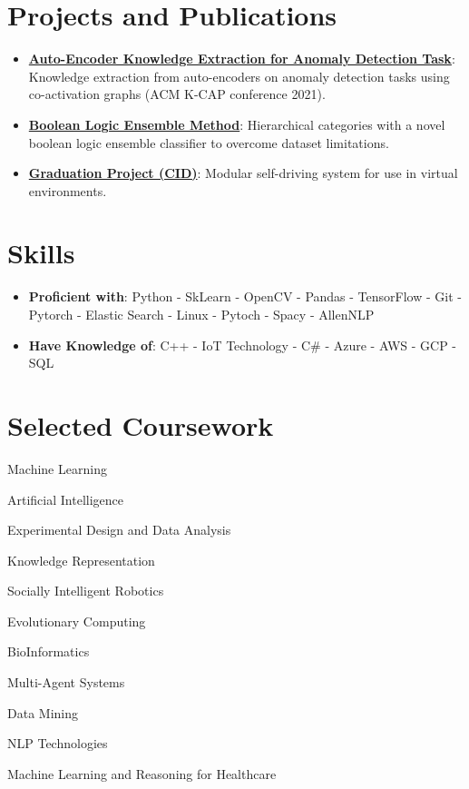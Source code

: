 \documentclass[letterpaper,11pt]{article}
\newcommand{\resumeItem}[2]{
  \item\small{
    \textbf{#1}{: #2 \vspace{-2pt}}
  }
}
\newcommand{\resumeItemNew}[1]{
	\item{
		{#1}
	}

	
}
\newcommand{\resumeNewItem}[1]{\resumeItemNew{#1}\vspace{-7pt}}
\newcommand{\resumeSubItem}[2]{\resumeItem{#1}{#2}\vspace{-5pt}}
\newcommand{\resumeSubHeadingListStart}{\begin{itemize}[leftmargin=*]}
\newcommand{\resumeSubHeadingListEnd}{\end{itemize}}
\begin{document}
\section{Projects and Publications}
  \resumeSubHeadingListStart
    \resumeSubItem{\href{https://github.com/daniyal9538/coactivation_AE_AD}{Auto-Encoder Knowledge Extraction for Anomaly Detection Task}}
      {Knowledge extraction from auto-encoders on anomaly detection tasks using co-activation graphs (ACM K-CAP conference 2021).}

\resumeSubItem{\href{https://exploringaiblog.wordpress.com/2019/09/20/implementing-hierarchical-categories-with-an-ensemble-classifier-to-overcome-dataset-limitations/}{Boolean Logic Ensemble Method}}
      {Hierarchical categories with a novel boolean logic ensemble classifier to overcome dataset limitations.}
\resumeSubItem{\href{https://github.com/daniyal9538/CID}{Graduation Project (CID)}}
      {Modular self-driving system for use in virtual environments.}
    
  \resumeSubHeadingListEnd

\section{Skills}
  \resumeSubHeadingListStart
     \item{
    	\textbf{Proficient with}{: Python  -  SkLearn - OpenCV -  Pandas - TensorFlow  - Git - Pytorch - Elastic Search - Linux  - Pytoch - Spacy - AllenNLP}
    }
    
    \item{
    	\textbf{Have Knowledge of}{: C++ - IoT Technology - C\# - Azure - AWS  - GCP - SQL}
    	
    }
 \resumeSubHeadingListEnd




\section{Selected Coursework}
\resumeSubHeadingListStart
\begin{multicols}{2}

	\resumeNewItem{Machine Learning}
	\resumeNewItem{Artificial Intelligence}
	\resumeNewItem{Experimental Design and Data Analysis}		
	\resumeNewItem{Knowledge Representation}
	\resumeNewItem{Socially Intelligent Robotics }
	\resumeNewItem{Evolutionary Computing}
\resumeNewItem{BioInformatics}
	\resumeNewItem{Multi-Agent Systems}
	\resumeNewItem{Data Mining}
	\resumeNewItem{NLP Technologies}
	\resumeNewItem{Machine Learning and Reasoning for Healthcare}
	
	
\end{multicols}
\resumeSubHeadingListEnd
%



\end{document}
